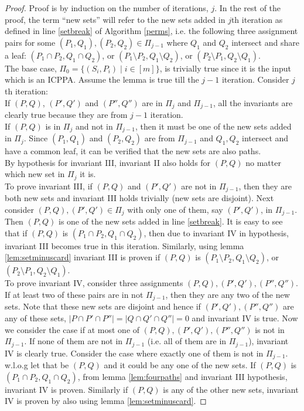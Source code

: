 \begin{proof}
  Proof is by induction on the number of iterations, $j$. In the rest
  of the proof, the term ``new sets'' will refer to the new sets added
  in $j$th iteration as defined in line \ref{setbreak} of Algorithm
  \ref{perms}, i.e. the following three assignment pairs for some
  $(P_1,Q_1), (P_2,Q_2) \in \Pi_{j-1}$ where $Q_1$ and $Q_2$ intersect
  and share a leaf: $(P_1 \cap P_2, Q_1 \cap Q_2)$, or $(P_1 \setminus
  P_2, Q_1 \setminus Q_2)$, or $(P_2 \setminus P_1, Q_2
  \setminus Q_1)$.\\
  \noindent
  The base case, $\Pi_0 = \{(S_i,P_i) \mid i \in [m]\}$, is trivially
  true since it is the input which is an ICPPA.  Assume the lemma is
  true till the $j-1$ iteration. Consider $j$th
  iteration:\\
  \noindent
  If $(P,Q)$, $(P',Q')$ and $(P'',Q'')$ are in $\Pi_{j}$ and
  $\Pi_{j-1}$, all the invariants are
  clearly true because they are from $j-1$ iteration.\\
  If $(P,Q)$ is in $\Pi_{j}$ and not in $\Pi_{j-1}$, then it must be
  one of the new sets added in $\Pi_j$. Since $(P_1,Q_1)$ and
  $(P_2,Q_2)$ are from $\Pi_{j-1}$ and $Q_1,Q_2$ intersect and have a
  common leaf, it can be verified that the
  new sets are also paths. \\
  By hypothesis for invariant III, invariant II also holds for $(P,Q)$
  no matter which new set in $\Pi_j$ it
  is.\\
  To prove invariant III, if $(P,Q)$ and $(P',Q')$ are not in
  $\Pi_{j-1}$, then they are both new sets and invariant III holds
  trivially (new sets are disjoint). Next consider $(P,Q), (P',Q') \in
  \Pi_j$ with only one of them, say $(P',Q')$, in $\Pi_{j-1}$. Then
  $(P,Q)$ is one of the new sets added in line \ref{setbreak}. It is
  easy to see that if $(P,Q)$ is $(P_1 \cap P_2, Q_1 \cap Q_2)$, then
  due to invariant IV in hypothesis, invariant III becomes true in
  this iteration. Similarly, using lemma \ref{lem:setminuscard}
  invariant III is proven if $(P, Q)$ is $(P_1 \setminus P_2, Q_1
  \setminus Q_2)$, or $(P_2 \setminus P_1, Q_2
  \setminus Q_1)$.\\
  To prove invariant IV, consider three assignments
  $(P,Q),(P',Q'),(P'',Q'')$. If at least two of these pairs are in not
  $\Pi_{j-1}$, then they are any two of the new sets. Note that these
  new sets are disjoint and hence if $(P',Q'), (P'',Q'')$ are any of
  these sets, $|P \cap P' \cap P''|=|Q \cap Q' \cap Q''|=0$ and
  invariant IV is true. Now we consider the case if at most one of
  $(P,Q),(P',Q'),(P'',Q'')$ is not in $\Pi_{j-1}$. If none of them are
  not in $\Pi_{j-1}$ (i.e. all of them are in $\Pi_{j-1}$), invariant
  IV is clearly true. Consider the case where exactly one of them is
  not in $\Pi_{j-1}$. w.l.o.g let that be $(P,Q)$ and it could be any
  one of the new sets. If $(P,Q)$ is $(P_1 \cap P_2, Q_1 \cap Q_2)$,
  from lemma \ref{lem:fourpaths} and invariant III hypothesis,
  invariant IV is proven. Similarly if $(P,Q)$ is any of the other new
  sets, invariant IV is proven by also using lemma
  \ref{lem:setminuscard}. %

\end{proof} 

